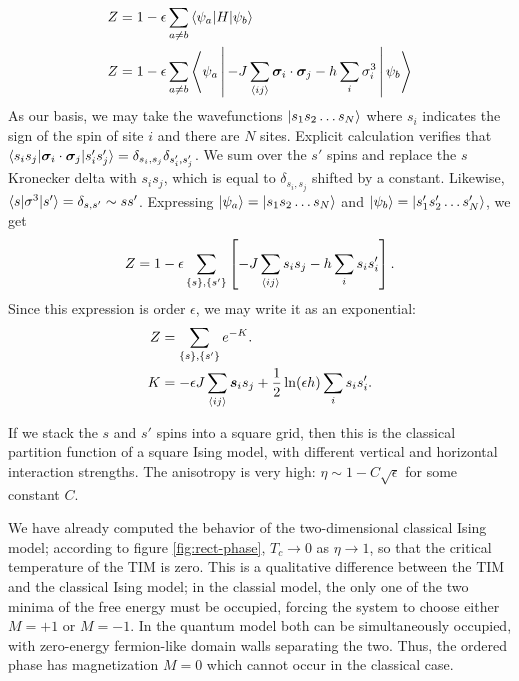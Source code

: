 \documentclass[
  amsmath,
  amssymb,
  aps,
  twocolumn,
  nofootinbib,
  nolongbibliography,
  floatfix,
]{revtex4-2}
\newcommand{\brackets}[1]{\left [ #1 \right ]}
\begin{document}
\begin{equation}
  \begin{split}
    Z &= 1 - \epsilon\sum_{a\neq b}\braket{\psi_a|H|\psi_b}\\
    Z &= 1 - \epsilon\sum_{a\neq b}\Braket{\psi_a|-J\sum_{\braket{ij}}\bm \sigma_i \cdot \bm \sigma_j - h\sum_i\sigma_i^3|\psi_b}
  \end{split}
\end{equation}
As our basis, we may take the wavefunctions $\ket{s_1 s_2 \dots s_N}$ where $s_i$ indicates the sign of the spin of site $i$ and there are $N$ sites. Explicit calculation verifies that $\braket{s_is_j|\bm \sigma_i \cdot \bm \sigma_j|s_i's_j'}=\delta_{s_i,s_j}\delta_{s'_i,s'_j}$. We sum over the $s'$ spins and replace the $s$ Kronecker delta with $s_i s_j$, which is equal to $\delta_{s_i,s_j}$ shifted by a constant. Likewise, $\braket{s|\sigma^3|s'}=\delta_{s,s'}\sim ss'$. Expressing $\ket{\psi_a}=\ket{s_1 s_2 \dots s_N}$ and $\ket{\psi_b}=\ket{s'_1 s'_2 \dots s'_N}$, we get
\begin{equation}
  Z = 1 - \epsilon\sum_{\{s\},\{s'\}} \brackets{-J\sum_{\braket{ij}} s_is_j - h\sum_is_i s'_i}.
\end{equation}
Since this expression is order $\epsilon$, we may write it as an exponential:
\begin{equation}
  \begin{split}
    Z &= \sum_{\{s\},\{s'\}} e^{-K}.\\
    K &= -\epsilon J\sum_{\braket{ij}}\bm s_is_j +\frac{1}{2}\ln(\epsilon h)\sum_is_i s'_i.
  \end{split}
\end{equation}

If we stack the $s$ and $s'$ spins into a square grid, then this is the classical partition function of a square Ising model, with different vertical and horizontal interaction strengths. The anisotropy is very high: $\eta \sim 1 - C\sqrt{\epsilon}$ for some constant $C$.

We have already computed the behavior of the two-dimensional classical Ising model; according to figure \ref{fig:rect-phase}, $T_c\rightarrow 0$ as $\eta \rightarrow 1$, so that the critical temperature of the TIM is zero. This is a qualitative difference between the TIM and the classical Ising model; in the classial model, the only one of the two minima of the free energy must be occupied, forcing the system to choose either $M=+1$ or $M=-1$. In the quantum model both can be simultaneously occupied, with zero-energy fermion-like domain walls separating the two. Thus, the ordered phase has magnetization $M=0$ which cannot occur in the classical case.
\end{document}
